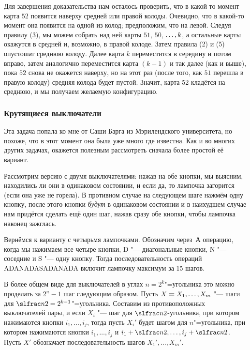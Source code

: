 \documentclass[twoside]{book}
\begin{document}
Для завершения доказательства нам осталось проверить, что в какой-то момент карта $52$ появится наверху средней или правой колоды.
Очевидно, что в какой-то момент она появится на одной из колод;
предположим, что на левой.
Следуя правилу (3), мы можем собрать над ней карты $51$, $50$, $\z\dots, k$, а остальные карты окажутся в средней и, возможно, в правой колоде.
Затем правила (2) и (5) опустошат среднюю колоду.
Далее карта $k$ переместится в середину и потом вправо, затем аналогично переместится карта $(k+1)$ и так далее (как и выше), пока $52$ снова не окажется наверху, но на этот раз (после того, как $51$ перешла в правую колоду) средняя колода будет пустой.
Значит, карта $52$ кладётся на среднюю, и мы получаем желаемую конфигурацию.

\subsubsection*{Крутящиеся выключатели}%

Эта задача попала ко мне от Саши Барга из Мэрилендского университета, но похоже, что в этот момент она была уже много где известна.
Как и во многих других задачах, окажется полезным рассмотреть сначала более простой её вариант.

\medskip

Рассмотрим версию с двумя выключателями: нажав на обе кнопки, мы выясним, находились ли они в одинаковом состоянии, и если да, то лампочка загорится (если она уже не горела).
В противном случае на следующем шаге нажмём одну кнопку, после этого кнопки \emph{будут} в одинаковом состоянии и в наихудшем случае нам придётся сделать ещё один шаг, нажав сразу обе кнопки, чтобы лампочка наконец зажглась.

Вернёмся к варианту с четырьмя лампочками.
Обозначим через~А операцию, когда мы нажимаем все четыре кнопки, 
D "--- диагональные кнопки, 
N "--- соседние и 
S "--- одну кнопку.
Тогда последовательность операций ADANADASADANADA включит лампочку максимум за 15 шагов. %

В более общем виде для выключателей в углах $n=2^k$"=угольника это можно проделать за $2^{n}-1$ шаг следующим образом.
Пусть $X\hm=X_1,\dots,X_m$ "--- шаги для $\slfrac n2=2^{k-1}$"=угольника.
Составим из противоположных выключателей пары, и если $X_i$ "--- шаг для $\slfrac n2$-угольника, при котором нажимаются кнопки $i_1,\dots,i_j$, тогда пусть $X_i'$ будет шагом для $n$"=угольника, при котором нажимаются кнопки $i_1,\dots,i_j$ и $i_1+\slfrac n2,\dots,i_j+\slfrac n2$.
Пусть $X'$ обозначает последовательность шагов $X_1',\dots,X_m'$.
\end{document}
